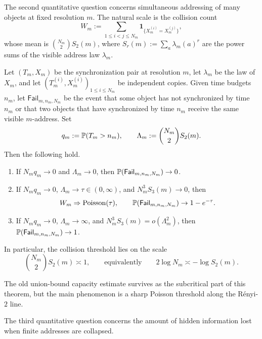 The second quantitative question concerns simultaneous addressing of
many objects at fixed resolution \(m\).  The natural scale is the
collision count
\[
  W_m := \sum_{1\leq i<j\leq N_m}
    \mathbf{1}_{\{X_m^{(i)}=X_m^{(j)}\}},
\]
whose mean is \(\binom{N_m}{2}S_2(m)\), where
\(S_r(m):=\sum_{a}\lambda_m(a)^r\) are the power sums of the visible
address law \(\lambda_m\).

\begin{theorem}
\label{thm:main-capacity}
Let \((T_m,X_m)\) be the synchronization pair at resolution \(m\), let
\(\lambda_m\) be the law of \(X_m\), and let
\((T_m^{(i)},X_m^{(i)})_{1\leq i\leq N_m}\) be independent copies.
Given time budgets \(n_m\), let \(\mathsf{Fail}_{m,n_m,N_m}\) be the
event that some object has not synchronized by time \(n_m\) or that two
objects that have synchronized by time \(n_m\) receive the same visible
\(m\)-address.  Set
\[
  q_m:=\mathbb{P}(T_m>n_m),
  \qquad
  \Lambda_m:=\binom{N_m}{2}S_2(m).
\]
Then the following hold.
\begin{enumerate}[label=(\roman*)]
  \item If \(N_m q_m\to 0\) and \(\Lambda_m\to 0\), then
    \(\mathbb{P}(\mathsf{Fail}_{m,n_m,N_m})\to 0\).
  \item If \(N_m q_m\to 0\), \(\Lambda_m\to\tau\in(0,\infty)\), and
    \(N_m^3S_3(m)\to 0\), then
    \[
      W_m \Rightarrow \mathrm{Poisson}(\tau),
      \qquad
      \mathbb{P}(\mathsf{Fail}_{m,n_m,N_m})\to 1-e^{-\tau}.
    \]
  \item If \(N_m q_m\to 0\), \(\Lambda_m\to\infty\), and
    \(N_m^3S_3(m)=o(\Lambda_m^2)\), then
    \(\mathbb{P}(\mathsf{Fail}_{m,n_m,N_m})\to 1\).
\end{enumerate}
In particular, the collision threshold lies on the scale
\[
  \binom{N_m}{2}S_2(m)\asymp 1,
  \qquad\text{equivalently}\qquad
  2\log N_m \asymp -\log S_2(m).
\]
\end{theorem}

The old union-bound capacity estimate survives as the subcritical part
of this theorem, but the main phenomenon is a sharp Poisson threshold
along the R\'enyi-\(2\) line.

The third quantitative question concerns the amount of hidden
information lost when finite addresses are collapsed.

